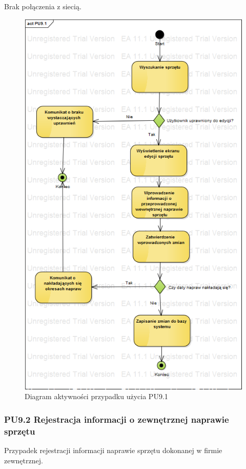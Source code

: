 Brak połączenia z siecią.

\begin{figure}[h!]
	\centering
	\includegraphics[scale=0.6]{img/diagrams/activityDiagrams/PU91}
	\caption{Diagram aktywności przypadku użycia PU9.1 \label{fig:labelADPU9.1}}
\end{figure}

\subsubsection{PU9.2 Rejestracja informacji o zewnętrznej naprawie sprzętu}
Przypadek rejestracji informacji naprawie sprzętu dokonanej w firmie zewnętrznej.


